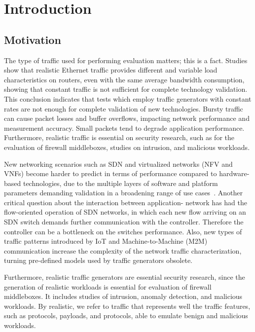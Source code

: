 \chapter{Introduction}\label{ch:introduction}

\section{Motivation}
 

The type of traffic used for performing evaluation matters; this is a fact. Studies show that realistic Ethernet traffic provides different and variable load characteristics on routers\cite{harpoon-validation}, even with the same average bandwidth consumption, showing that constant traffic is not sufficient for complete technology validation. This conclusion indicates that tests which employ traffic generators with constant rates are not enough for complete validation of new technologies. Bursty traffic can cause packet losses and buffer overflows, impacting network performance and measurement accuracy\cite{burstiness-queue-lenght}. Small packets tend to degrade application performance\cite{comparative-trafficgen-tools}.  Furthermore, realistic traffic is essential on security research, such as for the evaluation of firewall middleboxes, studies on intrusion, and malicious workloads\cite{ditg-paper}. 

New networking scenarios such as \acrshort{SDN} and virtualized networks (\acrshort{NFV} and \acrfull{VNF}s) become harder to predict in terms of performance compared to hardware-based technologies, due to the multiple layers of software and platform parameters demanding validation in a broadening range of use cases~\cite{nfv-challenges}. Another critical question about the interaction between application- network has had the flow-oriented operation of SDN networks, in which each new flow arriving on an SDN switch demands further communication with the controller. Therefore the controller can be a bottleneck on the switches performance.  Also,  new types of traffic patterns introduced by \acrfull{IoT} and Machine-to-Machine (\acrfull{M2M}) communication\cite{machine2machine}  increase the complexity of the network traffic characterization, turning pre-defined models used by traffic generators obsolete. 

Furthermore, realistic traffic generators are essential security research, since the generation of realistic workloads is essential for evaluation of firewall middleboxes. It includes studies of intrusion, anomaly detection, and malicious workloads. By realistic, we refer to traffic that represents well the traffic features, such as protocols, payloads, and protocols, able to emulate benign and malicious workloads. 

